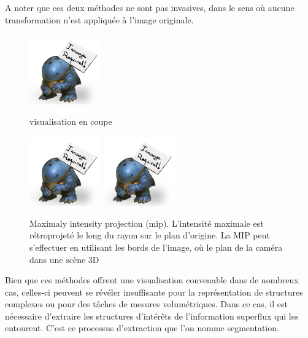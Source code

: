A noter que ces deux méthodes ne sont pas invasives, dans le sens où aucune transformation n'est appliquée à l'image originale.

\begin{figure}
  \centering
  \includegraphics[height=3cm]{Images/img_required.jpg}
  \label{fig:visualisation en coupe}
  \caption{visualisation en coupe}
\end{figure}

\begin{figure}
  \centering
  \includegraphics[height=3cm]{Images/img_required.jpg}
  \includegraphics[height=3cm]{Images/img_required.jpg}
  \label{fig:visualisation MIP}
  \caption{Maximaly intensity projection (mip). L'intensité maximale est rétroprojeté le long du rayon sur le plan d'origine. La MIP peut s'effectuer en utilisant les bords de l'image, où le plan de la caméra dans une scène 3D}
\end{figure}

Bien que ces méthodes offrent une visualisation convenable dans de nombreux cas, celles-ci peuvent se révéler insuffisante pour la représentation de structures complexes ou pour des tâches de mesures volumétriques. Dans ce cas, il est nécessaire d'extraire les structures d'intérêts de l'information superflux qui les entourent. C'est ce processus d'extraction que l'on nomme segmentation.  


